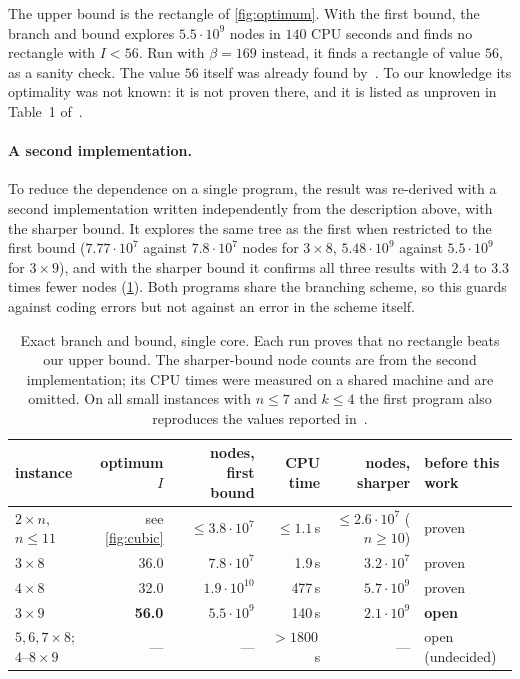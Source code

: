 \documentclass[11pt]{article}
\theoremstyle{plain}
\theoremstyle{definition}
\theoremstyle{remark}
\begin{document}
\noindent The upper bound is the rectangle of \cref{fig:optimum}. With the first bound, the branch
and bound explores $5.5\cdot10^9$ nodes in $140$ CPU seconds and finds no rectangle with $I<56$.
Run with $\beta=169$ instead, it finds a rectangle of value $56$, as a sanity check. The value
$56$ itself was already found by~\citet{DiazLeBrasGomes2017}. To our knowledge its optimality
was not known: it is not proven there, and it is listed as unproven in Table~1
of~\citep{VoborilRamaswamySzeider2025}.

\paragraph{A second implementation.} To reduce the dependence on a single program, the result was
re-derived with a second implementation written independently from the description above, with
the sharper bound. It explores the same tree as the first when restricted to the first bound
($7.77\cdot10^7$ against $7.8\cdot10^7$ nodes for $3\times 8$, $5.48\cdot10^9$ against $5.5\cdot10^9$ for
$3\times9$), and with the sharper bound it confirms all three results with $2.4$ to $3.3$ times
fewer nodes (\cref{tab:exact}). Both programs share the branching scheme, so this guards against
coding errors but not against an error in the scheme itself.

\begin{table}[t]
\centering
\footnotesize
\setlength{\tabcolsep}{4pt}
\begin{tabular}{@{}lrrrrl@{}}
\toprule
instance & optimum $I$ & nodes, first bound & CPU time & nodes, sharper & before this work \\
\midrule
$2\times n$, $n\le 11$ & see \cref{fig:cubic} & $\le 3.8\cdot10^7$ & $\le 1.1$\,s & $\le 2.6\cdot10^7$ ($n\ge10$) & proven \citep{DiazLeBrasGomes2017,MirkaEtAl2023} \\
$3\times 8$ & 36.0 & $7.8\cdot10^7$ & 1.9\,s & $3.2\cdot10^7$ & proven \citep{DiazLeBrasGomes2017,RamaswamySzeider2023} \\
$4\times 8$ & 32.0 & $1.9\cdot10^{10}$ & 477\,s & $5.7\cdot10^9$ & proven \citep{VoborilRamaswamySzeider2025} \\
$3\times 9$ & \textbf{56.0} & $5.5\cdot10^9$ & 140\,s & $2.1\cdot10^9$ & \textbf{open} \\
\midrule
$5,6,7\times 8$;\ $4$--$8\times 9$ & --- & --- & $>1800$\,s & --- & open (undecided) \\
\bottomrule
\end{tabular}
\caption{Exact branch and bound, single core. Each run proves that no rectangle beats our upper
bound. The sharper-bound node counts are from the second implementation; its CPU times were measured
on a shared machine and are omitted. On all small instances with $n\le7$ and $k\le4$ the first
program also reproduces the values reported in~\citep{DiazLeBrasGomes2017}.}
\label{tab:exact}
\end{table}
\end{document}

